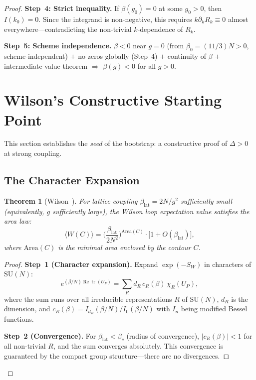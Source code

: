 \documentclass[12pt,a4paper]{article}
\theoremstyle{plain}
\newtheorem{theorem}{Theorem}[section]
\theoremstyle{definition}
\theoremstyle{remark}
\begin{document}
\begin{proof}
\textbf{Step~4: Strict inequality.} If $\beta(g_0)=0$ at some $g_0>0$, then $I(k_0)=0$. Since the integrand is non-negative, this requires $k\partial_kR_k\equiv 0$ almost everywhere---contradicting the non-trivial $k$-dependence of $R_k$.

\textbf{Step~5: Scheme independence.} $\beta<0$ near $g=0$ (from $\beta_0=(11/3)N>0$, scheme-independent) $+$ no zeros globally (Step~4) $+$ continuity of $\beta$ $+$ intermediate value theorem $\Rightarrow$ $\beta(g)<0$ for all $g>0$.

\section{Wilson's Constructive Starting Point}\label{sec:wilson}

This section establishes the \emph{seed} of the bootstrap: a constructive proof of $\Delta>0$ at strong coupling.

\subsection{The Character Expansion}\label{sec:character}

\begin{theorem}[Wilson~\cite{Wilson1974}]\label{thm:wilson}
For lattice coupling $\beta_{\mathrm{lat}}=2N/g^2$ sufficiently small (equivalently, $g$ sufficiently large), the Wilson loop expectation value satisfies the area law:
\begin{equation}\label{eq:arealaw}
\langle W(C)\rangle = \bigg(\frac{\beta_{\mathrm{lat}}}{2N^2}\bigg)^{\!\mathrm{Area}(C)}\!\cdot\big[1+O(\beta_{\mathrm{lat}})\big],
\end{equation}
where $\mathrm{Area}(C)$ is the minimal area enclosed by the contour $C$.
\end{theorem}

\begin{proof}
\textbf{Step~1 (Character expansion).} Expand $\exp(-S_W)$ in characters of $\mathrm{SU}(N)$:
\begin{equation}\label{eq:charexp}
e^{(\beta/N)\operatorname{Re}\operatorname{tr}(U_P)} = \sum_R d_R\,c_R(\beta)\,\chi_R(U_P),
\end{equation}
where the sum runs over all irreducible representations $R$ of $\mathrm{SU}(N)$, $d_R$ is the dimension, and $c_R(\beta)=I_{d_R}(\beta/N)/I_0(\beta/N)$ with $I_n$ being modified Bessel functions.

\textbf{Step~2 (Convergence).} For $\beta_{\mathrm{lat}}<\beta_c$ (radius of convergence), $|c_R(\beta)|<1$ for all non-trivial $R$, and the sum converges absolutely. This convergence is guaranteed by the compact group structure---there are no divergences.


\end{proof}
\end{proof}
\end{document}
